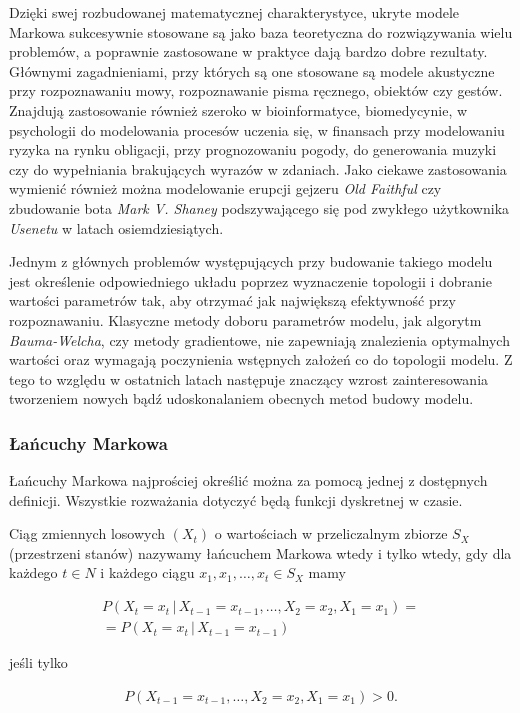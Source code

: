 Dzięki swej rozbudowanej matematycznej charakterystyce, ukryte modele Markowa sukcesywnie stosowane są jako baza teoretyczna do rozwiązywania wielu problemów, a poprawnie zastosowane w praktyce dają bardzo dobre rezultaty. Głównymi zagadnieniami, przy których są one stosowane są modele akustyczne przy rozpoznawaniu mowy, rozpoznawanie pisma ręcznego, obiektów czy gestów. Znajdują zastosowanie również szeroko w bioinformatyce, biomedycynie, w psychologii do modelowania procesów uczenia się, w finansach przy modelowaniu ryzyka na rynku obligacji, przy prognozowaniu pogody, do generowania muzyki czy do wypełniania brakujących wyrazów w zdaniach. Jako ciekawe zastosowania wymienić również można modelowanie erupcji gejzeru \textit{Old Faithful} czy zbudowanie bota \textit{Mark V. Shaney} podszywającego się pod zwykłego użytkownika \textit{Usenetu} w latach osiemdziesiątych.

Jednym z głównych problemów występujących przy budowanie takiego modelu jest określenie odpowiedniego układu poprzez wyznaczenie topologii i dobranie wartości parametrów tak, aby otrzymać jak największą efektywność przy rozpoznawaniu. Klasyczne metody doboru parametrów modelu, jak algorytm \textit{Bauma-Welcha}, czy metody gradientowe, nie zapewniają znalezienia optymalnych wartości oraz wymagają poczynienia wstępnych założeń co do topologii modelu. Z tego to względu w ostatnich latach następuje znaczący wzrost zainteresowania tworzeniem nowych bądź udoskonalaniem obecnych metod budowy modelu.

\newpage

\subsubsection{Łańcuchy Markowa}

Łańcuchy Markowa najprościej określić można za pomocą jednej z dostępnych definicji. Wszystkie rozważania dotyczyć będą funkcji dyskretnej w czasie.

\begin{theorem}
Ciąg zmiennych losowych $(X_{t})$ o wartościach w przeliczalnym zbiorze $S_{X}$ (przestrzeni stanów) nazywamy łańcuchem Markowa wtedy i tylko wtedy, gdy dla każdego $t \in N$ i każdego ciągu $x_{1},x_{1},\dots,x_{t} \in S_{X}$ mamy

\begin{align}
\nonumber P(X_{t}=x_{t}\,|\,X_{t-1}=x_{t-1},\dots,X_{2}=x_{2},X_{1}=x_{1})=\\=P(X_{t}=x_{t}\,|\,X_{t-1}=x_{t-1})
\end{align} 

jeśli tylko

\begin{align}
P(X_{t-1}=x_{t-1},\dots,X_{2}=x_{2},X_{1}=x_{1})>0.
\end{align}
\end{theorem}

